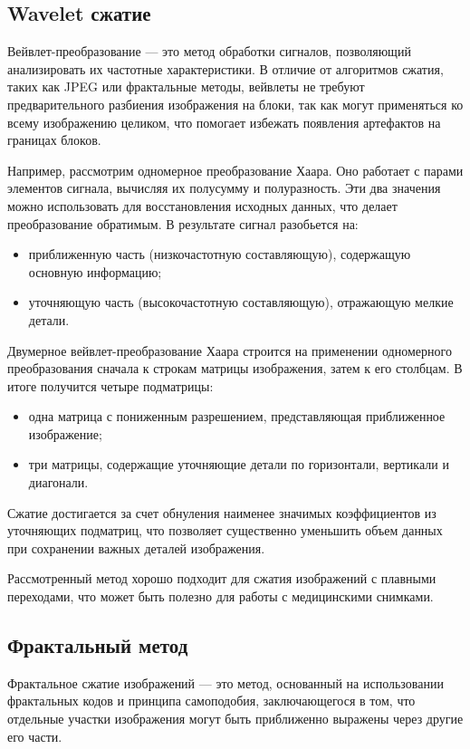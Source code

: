 \subsection{Wavelet сжатие}

Вейвлет-преобразование \cite{WaveletCompression} --- это метод обработки сигналов, позволяющий анализировать их частотные характеристики. В отличие от алгоритмов сжатия, таких как JPEG или фрактальные методы, вейвлеты не требуют предварительного разбиения изображения на блоки, так как могут применяться ко всему изображению целиком, что помогает избежать появления артефактов на границах блоков.

Например, рассмотрим одномерное преобразование Хаара. Оно работает с парами элементов сигнала, вычисляя их полусумму и полуразность. Эти два значения можно использовать для восстановления исходных данных, что делает преобразование обратимым. В результате сигнал разобьется на:
\begin{itemize}
    \item приближенную часть (низкочастотную составляющую), содержащую основную информацию;
    \item уточняющую часть (высокочастотную составляющую), отражающую мелкие детали.
\end{itemize}

Двумерное вейвлет-преобразование Хаара строится на применении одномерного преобразования сначала к строкам матрицы изображения, затем к его столбцам. В итоге получится четыре подматрицы:
\begin{itemize}
    \item одна матрица с пониженным разрешением, представляющая приближенное изображение;
    \item три матрицы, содержащие уточняющие детали по горизонтали, вертикали и диагонали.
\end{itemize}

Сжатие достигается за счет обнуления наименее значимых коэффициентов из уточняющих подматриц, что позволяет существенно уменьшить объем данных при сохранении важных деталей изображения.

Рассмотренный метод хорошо подходит для сжатия изображений с плавными переходами, что может быть полезно для работы с медицинскими снимками.


\subsection{Фрактальный метод}

Фрактальное сжатие изображений \cite{FractalCompression} --- это метод, основанный на использовании фрактальных кодов и принципа самоподобия, заключающегося в том, что отдельные участки изображения могут быть приближенно выражены через другие его части.

